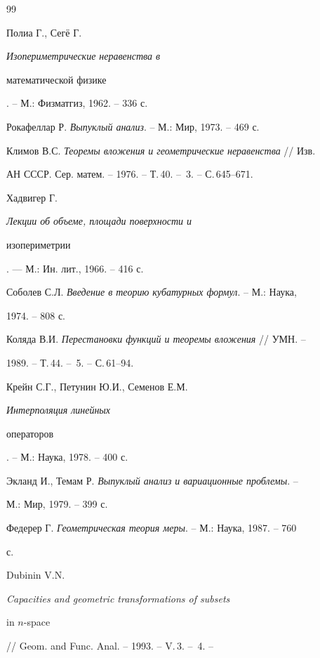  


 


\begin{thebibliography}{99} 


 




Полиа Г., Сег\"е Г. {\em Изопериметрические неравенства в 


математической физике} . -- М.: Физматгиз, 1962. -- 336 с. 




Рокафеллар Р. {\em Выпуклый анализ}. -- М.: Мир, 1973. -- 469 с. 




Климов В.С. {\em Теоремы вложения и геометрические неравенства} // Изв. 


АН СССР. Сер. матем. -- 1976. -- Т.\,40. -- \No\,3. -- С.\,645--671. 




Хадвигер Г. {\em Лекции об объеме, площади поверхности и 


изопериметрии}. --- М.: Ин. лит., 1966. -- 416 с. 




Соболев С.Л. {\em Введение в теорию кубатурных формул}. -- М.: Наука, 


1974. -- 808 с. 




Коляда В.И. {\em Перестановки функций и теоремы вложения} // УМН. -- 


1989. -- Т.\,44. -- \No\,5. -- С.\,61--94. 




Крейн С.Г., Петунин Ю.И., Семенов Е.М. {\em Интерполяция линейных 


операторов}. -- М.: Наука, 1978. -- 400 с. 




Экланд И., Темам Р. {\em Выпуклый анализ и вариационные проблемы}. -- 


М.: Мир, 1979. -- 399 с. 




Федерер Г. {\em Геометрическая теория меры}. -- М.: Наука, 1987. -- 760 


с. 




Dubinin V.N. {\em Capacities and geometric transformations of subsets 


in $n$-space} // Geom. and Func. Anal. -- 1993. -- V.\,3. -- \No\,4. -- 



\end{thebibliography}
